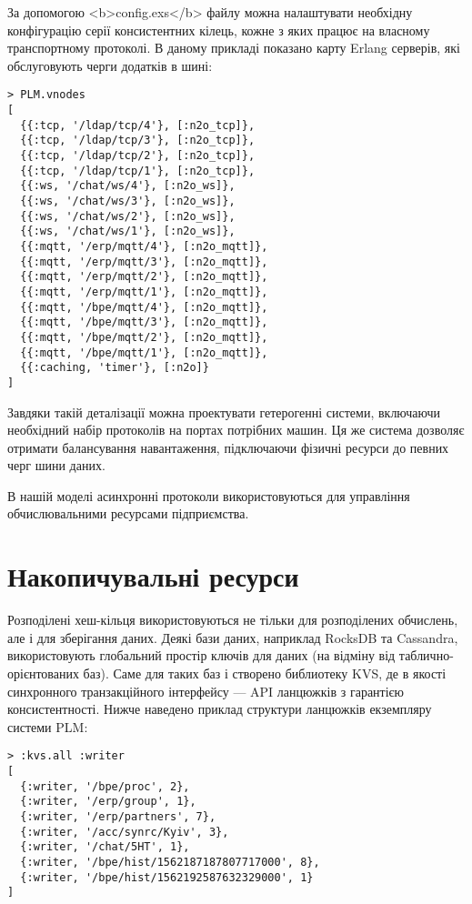         За допомогою <b>config.exs</b> файлу можна налаштувати необхідну
           конфігурацію серії консистентних кілець, кожне з яких працює
           на власному транспортному протоколі. В даному прикладі показано
           карту Erlang серверів, які обслуговують черги додатків в шині:

\begin{lstlisting}
> PLM.vnodes
[
  {{:tcp, '/ldap/tcp/4'}, [:n2o_tcp]},
  {{:tcp, '/ldap/tcp/3'}, [:n2o_tcp]},
  {{:tcp, '/ldap/tcp/2'}, [:n2o_tcp]},
  {{:tcp, '/ldap/tcp/1'}, [:n2o_tcp]},
  {{:ws, '/chat/ws/4'}, [:n2o_ws]},
  {{:ws, '/chat/ws/3'}, [:n2o_ws]},
  {{:ws, '/chat/ws/2'}, [:n2o_ws]},
  {{:ws, '/chat/ws/1'}, [:n2o_ws]},
  {{:mqtt, '/erp/mqtt/4'}, [:n2o_mqtt]},
  {{:mqtt, '/erp/mqtt/3'}, [:n2o_mqtt]},
  {{:mqtt, '/erp/mqtt/2'}, [:n2o_mqtt]},
  {{:mqtt, '/erp/mqtt/1'}, [:n2o_mqtt]},
  {{:mqtt, '/bpe/mqtt/4'}, [:n2o_mqtt]},
  {{:mqtt, '/bpe/mqtt/3'}, [:n2o_mqtt]},
  {{:mqtt, '/bpe/mqtt/2'}, [:n2o_mqtt]},
  {{:mqtt, '/bpe/mqtt/1'}, [:n2o_mqtt]},
  {{:caching, 'timer'}, [:n2o]}
]
\end{lstlisting}

        Завдяки такій деталізації можна проектувати гетерогенні системи,
           включаючи необхідний набір протоколів на портах потрібних машин. Ця же система
           дозволяє отримати балансування навантаження, підключаючи фізичні ресурси
           до певних черг шини даних.

        В нашій моделі асинхронні протоколи використовуються для управління
           обчислювальними ресурсами підприємства.

\section{Накопичувальні ресурси}

        Розподілені хеш-кільця використовуються не тільки для розподілених обчислень,
           але і для зберігання даних.
           Деякі бази даних, наприклад RocksDB та Cassandra, використовують глобальний простір
           ключів для даних (на відміну від таблично-орієнтованих баз). Саме для таких
           баз і створено библиотеку KVS, де в якості синхронного транзакційного
           інтерфейсу — API ланцюжків з гарантією консистентності. Нижче
           наведено приклад структури ланцюжків екземпляру системи PLM:

   \begin{lstlisting}
> :kvs.all :writer
[
  {:writer, '/bpe/proc', 2},
  {:writer, '/erp/group', 1},
  {:writer, '/erp/partners', 7},
  {:writer, '/acc/synrc/Kyiv', 3},
  {:writer, '/chat/5HT', 1},
  {:writer, '/bpe/hist/1562187187807717000', 8},
  {:writer, '/bpe/hist/1562192587632329000', 1}
]
    \end{lstlisting}

